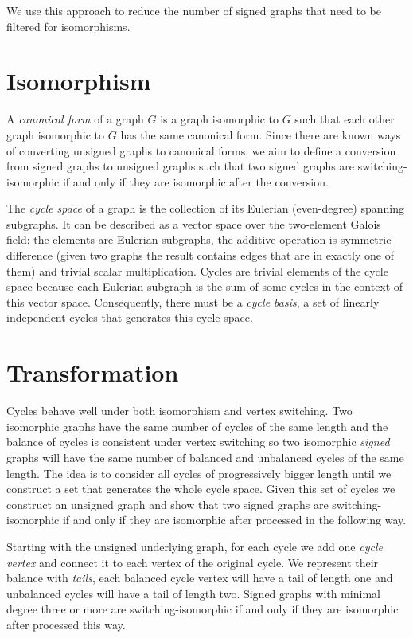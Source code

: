 We use this approach to reduce the number of signed graphs that need to be filtered for isomorphisms.

\section{Isomorphism}

A \textit{canonical form} of a graph $G$ is a graph isomorphic to $G$ such that each other graph isomorphic to $G$ has the same canonical form. Since there are known ways of converting unsigned graphs to canonical forms\cite{nauty}, we aim to define a conversion from signed graphs to unsigned graphs such that two signed graphs are switching-isomorphic if and only if they are isomorphic after the conversion.

The \textit{cycle space} of a graph is the collection of its Eulerian (even-degree) spanning subgraphs. It can be described as a vector space over the two-element Galois field: the elements are Eulerian subgraphs, the additive operation is symmetric difference (given two graphs the result contains edges that are in exactly one of them) and trivial scalar multiplication. Cycles are trivial elements of the cycle space because each Eulerian subgraph is the sum of some cycles in the context of this vector space. Consequently, there must be a \textit{cycle basis}, a set of linearly independent cycles that generates this cycle space.

\section{Transformation}

Cycles behave well under both isomorphism and vertex switching. Two isomorphic graphs have the same number of cycles of the same length and the balance of cycles is consistent under vertex switching so two isomorphic \textit{signed} graphs will have the same number of balanced and unbalanced cycles of the same length. The idea is to consider all cycles of progressively bigger length until we construct a set that generates the whole cycle space. Given this set of cycles we construct an unsigned graph and show that two signed graphs are switching-isomorphic if and only if they are isomorphic after processed in the following way.

\begin{theorem}\label{lem2:conversion}
    Starting with the unsigned underlying graph, for each cycle we add one \textit{cycle vertex} and connect it to each vertex of the original cycle. We represent their balance with \textit{tails}, each balanced cycle vertex will have a tail of length one and unbalanced cycles will have a tail of length two. Signed graphs with minimal degree three or more are switching-isomorphic if and only if they are isomorphic after processed this way.
\end{theorem}

